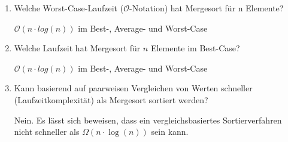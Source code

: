 \documentclass{bschlangaul-aufgabe}
\begin{document}
\begin{enumerate}
\begin{enumerate}
\item Welche Worst-Case-Laufzeit ($\mathcal{O}$-Notation) hat Mergesort
für n Elemente?

\begin{bAntwort}
$\mathcal{O}(n \cdot log(n))$ im Best-, Average- und Worst-Case
\end{bAntwort}

\item Welche Laufzeit hat Mergesort für $n$ Elemente im Best-Case?

\begin{bAntwort}
$\mathcal{O}(n \cdot log(n))$ im Best-, Average- und Worst-Case
\end{bAntwort}

\item Kann basierend auf paarweisen Vergleichen von Werten schneller
(Laufzeitkomplexität) als Mergesort sortiert werden?

\begin{bAntwort}
Nein. Es lässt sich beweisen, dass ein vergleichsbasiertes
Sortierverfahren nicht schneller als $\Omega (n\cdot \log(n))$ sein
kann.
\end{bAntwort}
\end{enumerate}
\end{enumerate}
\end{document}
